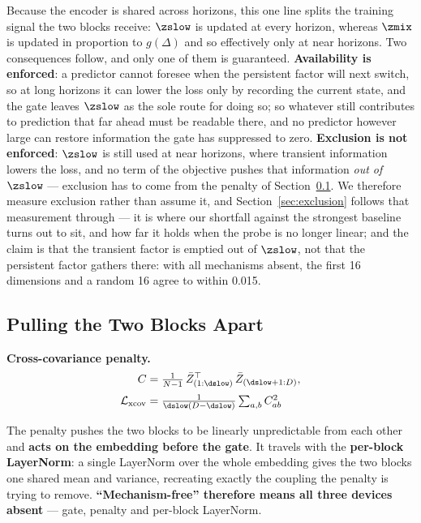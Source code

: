 Because the encoder is shared across horizons, this one line splits the training signal the two blocks receive: $\zslow$ is updated at every horizon, whereas $\zmix$ is updated in proportion to $g(\Delta)$ and so effectively only at near horizons. Two consequences follow, and only one of them is guaranteed. \textbf{Availability is enforced}: a predictor cannot foresee when the persistent factor will next switch, so at long horizons it can lower the loss only by recording the current state, and the gate leaves $\zslow$ as the sole route for doing so; so whatever still contributes to prediction that far ahead must be readable there, and no predictor however large can restore information the gate has suppressed to zero. \textbf{Exclusion is not enforced}: $\zslow$ is still used at near horizons, where transient information lowers the loss, and no term of the objective pushes that information \emph{out of} $\zslow$ --- exclusion has to come from the penalty of Section~\ref{sec:xcov}. We therefore measure exclusion rather than assume it, and Section~\ref{sec:exclusion} follows that measurement through --- it is where our shortfall against the strongest baseline turns out to sit, and how far it holds when the probe is no longer linear; and the claim is that the transient factor is emptied out of $\zslow$, not that the persistent factor gathers there: with all mechanisms absent, the first 16 dimensions and a random 16 agree to within 0.015.

\subsection{Pulling the Two Blocks Apart}
\label{sec:xcov}

\textbf{Cross-covariance penalty.}
\begin{equation}
\begin{split}
C &= \tfrac{1}{N-1}\,\bar Z^{\top}_{(1:\dslow)}\,\bar Z_{(\dslow+1:D)},\\[2pt]
\mathcal{L}_{\text{xcov}} &= \tfrac{1}{\dslow (D-\dslow)}\textstyle\sum_{a,b} C_{ab}^{2}
\end{split}
\label{eq:xcov}
\end{equation}

The penalty pushes the two blocks to be linearly unpredictable from each other and \textbf{acts on the embedding before the gate}. It travels with the \textbf{per-block LayerNorm}: a single LayerNorm over the whole embedding gives the two blocks one shared mean and variance, recreating exactly the coupling the penalty is trying to remove. \textbf{``Mechanism-free'' therefore means all three devices absent} --- gate, penalty and per-block LayerNorm.

